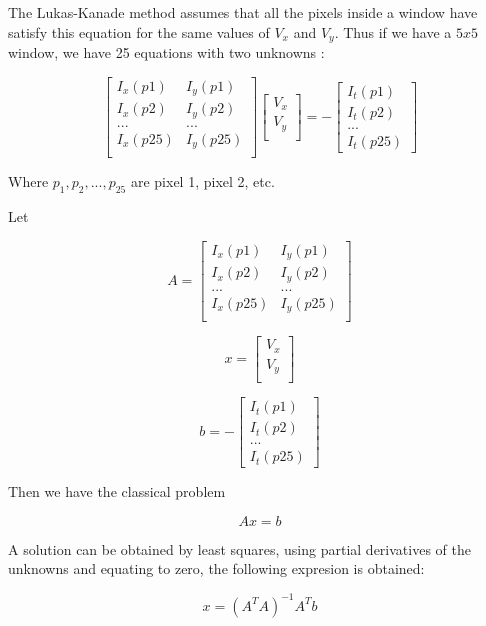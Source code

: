 The Lukas-Kanade method assumes that all the pixels inside a window have satisfy this equation for the same 
values of $V_x$ and $V_y$. Thus if we have a $5x5$ window, we have 25 equations with two unknowns :

$$
\begin{bmatrix}
I_x(p1) & I_y(p1) \\
I_x(p2) & I_y(p2) \\
... & ... \\
I_x(p25) & I_y(p25)\\
\end{bmatrix}  
\begin{bmatrix}
V_x \\
V_y\\
\end{bmatrix}
=
-\begin{bmatrix}
I_t(p1) \\
I_t(p2) \\
...     \\
I_t(p25) 
\end{bmatrix}
$$

Where $p_1, p_2, ..., p_{25}$ are pixel 1, pixel 2, etc.

Let 

$$
A = 
\begin{bmatrix}
I_x(p1) & I_y(p1) \\
I_x(p2) & I_y(p2) \\
... & ... \\
I_x(p25) & I_y(p25)\\
\end{bmatrix}  
$$

$$
x=
\begin{bmatrix}
V_x \\
V_y\\
\end{bmatrix}
$$

$$
b=
-\begin{bmatrix}
I_t(p1) \\
I_t(p2) \\
...     \\
I_t(p25) 
\end{bmatrix}
$$

Then we have the classical problem

$$ 
Ax = b
$$

A solution can be obtained by least squares, using partial derivatives of the unknowns and equating to zero, the following expresion
 is obtained:

$$
x = (A^T A)^{-1} A^T b
$$


